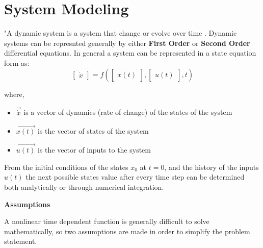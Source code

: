 \chapter{System Modeling}

"A dynamic system is a system that change or evolve over time \cite{CTMS2019_Modeling}. Dynamic systems can be represnted generally by either \textbf{First Order} or \textbf{Second Order} differential equations. In general a system can be represented in a state equation form as:
\begin{equation}
	\begin{bmatrix}
	\dot{x}
	\end{bmatrix} = f (\begin{bmatrix}
	x(t)
	\end{bmatrix},\begin{bmatrix}
	u(t)
	\end{bmatrix}, t )
\end{equation}

where,
\begin{itemize}
	\item $\vec{\dot{x}}$ is a vector of dynamics (rate of change) of the states of the system
	\item $\vec{x(t)}$ is the vector of states of the system
	\item $\vec{u(t)}$ is the vector of inputs to the system
\end{itemize}

From the initial conditions of the states $x_0$ at $t = 0$, and the history of the inputs $u(t)$ the next possible states value after every time step can be determined both analytically or through numerical integration.

\textbf{Assumptions}

A nonlinear time dependent function is generally difficult to solve mathematically, so two assumptions are made in order to simplify the problem statement.

